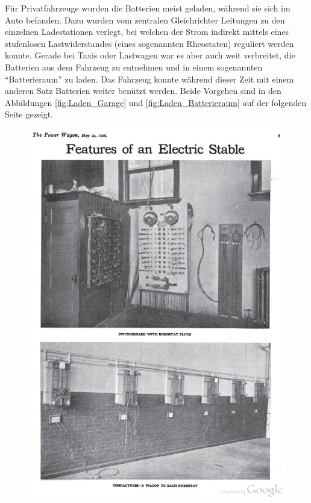 Für Privatfahrzeuge wurden die Batterien meist geladen, während sie sich im Auto befanden. Dazu wurden vom zentralen Gleichrichter Leitungen zu den einzelnen Ladestationen verlegt, bei welchen der Strom indirekt mittels eines stufenlosen Lastwiderstandes (eines sogenannten Rheostaten) reguliert werden konnte. Gerade bei Taxis oder Lastwagen war es aber auch weit verbreitet, die Batterien aus dem Fahrzeug zu entnehmen und in einem sogenannten "`Batterieraum"' zu laden. Das Fahrzeug konnte während dieser Zeit mit einem anderen Satz Batterien weiter benützt werden. Beide Vorgehen sind in den Abbildungen \ref{fig:Laden_Garage} und \ref{fig:Laden_Batterieraum} auf der folgenden Seite gezeigt.

\begin{landscape}
\begin{figure}
\begin{minipage}{0.65\textwidth}
	\includegraphics[width=\textwidth]{images/Laden_Garage.jpg}

\end{minipage}
\end{figure}
\end{landscape}
